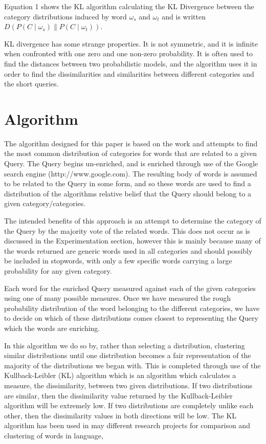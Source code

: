 \documentclass[letterpaper]{article}
\begin{document}
Equation 1 shows the KL algorithm calculating the KL Divergence between the category distributions induced by word $\omega_{s}$ and $\omega_{t}$  and is written $D(P(C\mid\omega_{s}) \parallel P(C \mid \omega_{t}))$.

KL divergence has some strange properties. It is not symmetric, and it is infinite when confronted with one zero and one non-zero probability. It is often used to find the distances between two probabilistic models, and the algorithm uses it in order to find the dissimilarities and similarities between different categories and the short queries.

\section{Algorithm}
The algorithm designed for this paper is based on the work \cite{baker1998distributional} and attempts to find the most common distribution of categories for words that are related
to a given Query. The Query begins un-enriched, and is enriched through use of the Google search engine (http://www.google.com). The resulting body of words is assumed
to be related to the Query in some form, and so these words are used to find a distribution of the algorithms relative belief that the Query should belong to a given category/categories.


The intended benefits of this approach is an attempt to determine the category of the Query by the majority vote of the related words. This does not occur as is discussed in the Experimentation section, however this is mainly because many of the words returned are generic words used in all categories and should possibly be included in stopwords, with only a few specific words carrying a large probability for any given category. 


Each word for the enriched Query measured against each of the given categories using one of many possible measures. Once we have measured the rough probability distribution of the word
belonging to the different categories, we have to decide on which of these distributions comes closest to representing the Query which the words are enriching. 

In this algorithm we do so by, rather than selecting a distribution, clustering similar distributions until one distribution becomes a fair representation of the majority of the distributions
we began with. This is completed through use of the Kullback-Leibler (KL) algorithm \cite{kullback1987kullback} which is an algorithm which calculates a measure, the dissimilarity, between two given distributions. If two distributions are similar, then the dissimilarity value returned by the Kullback-Leibler algorithm will be extremely low. If two distributions are completely unlike each other, then the dissimilarity values in both directions will be low. The KL algorithm has been used in may different research projects for comparison and clustering of words in language, \cite{pereira1993distributional}
\end{document}
